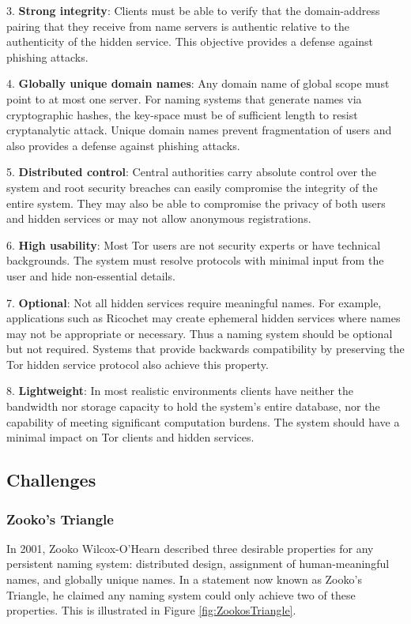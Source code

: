\documentclass[USenglish,oneside,twocolumn]{article}
\begin{document}
3. \textbf{Strong integrity}: Clients must be able to verify that the domain-address pairing that they receive from name servers is authentic relative to the authenticity of the hidden service. This objective provides a defense against phishing attacks.

4. \textbf{Globally unique domain names}: Any domain name of global scope must point to at most one server. For naming systems that generate names via cryptographic hashes, the key-space must be of sufficient length to resist cryptanalytic attack. Unique domain names prevent fragmentation of users and also provides a defense against phishing attacks.

5. \textbf{Distributed control}: Central authorities carry absolute control over the system and root security breaches can easily compromise the integrity of the entire system. They may also be able to compromise the privacy of both users and hidden services or may not allow anonymous registrations.

6. \textbf{High usability}: Most Tor users are not security experts or have technical backgrounds. The system must resolve protocols with minimal input from the user and hide non-essential details.

7. \textbf{Optional}: Not all hidden services require meaningful names. For example, applications such as Ricochet \cite{RicochetGithub} may create ephemeral hidden services where names may not be appropriate or necessary. Thus a naming system should be optional but not required. Systems that provide backwards compatibility by preserving the Tor hidden service protocol also achieve this property.

8. \textbf{Lightweight}: In most realistic environments clients have neither the bandwidth nor storage capacity to hold the system's entire database, nor the capability of meeting significant computation burdens. The system should have a minimal impact on Tor clients and hidden services.

\subsection{Challenges}

\subsubsection{Zooko's Triangle}
\label{sec:ZookosTriangle}

In 2001, Zooko Wilcox-O'Hearn described three desirable properties for any persistent naming system: distributed design, assignment of human-meaningful names, and globally unique names. In a statement now known as Zooko's Triangle, \cite{ferdous2009security, stiegler2005petname} he claimed any naming system could only achieve two of these properties. This is illustrated in Figure \ref{fig:ZookosTriangle}.
\end{document}
